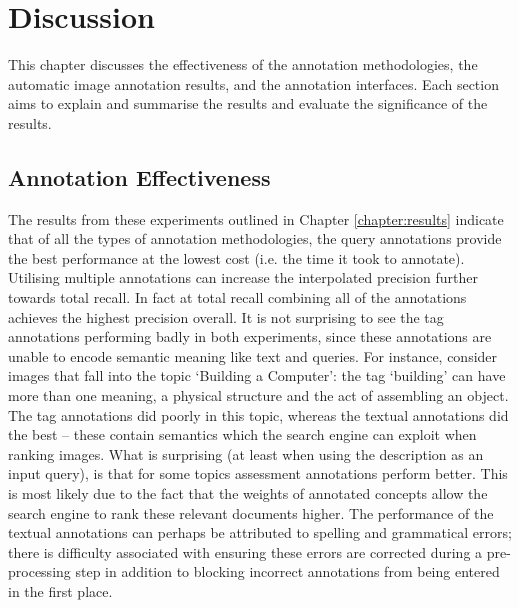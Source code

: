 \chapter{Discussion}

This chapter discusses the effectiveness of the annotation methodologies, the automatic image annotation results, and the annotation interfaces. Each section aims to explain and summarise the results and evaluate the significance of the results.

\section{Annotation Effectiveness}

The results from these experiments outlined in Chapter \ref{chapter:results} indicate that of all the types of annotation methodologies, the query annotations provide the best performance at the lowest cost (i.e. the time it took to annotate). Utilising multiple annotations can increase the interpolated precision further towards total recall. In fact at total recall combining all of the annotations achieves the highest precision overall. It is not surprising to see the tag annotations performing badly in both experiments, since these annotations are unable to encode semantic meaning like text and queries. For instance, consider images that fall into the topic `Building a Computer': the tag `building' can have more than one meaning, a physical structure and the act of assembling an object. The tag annotations did poorly in this topic, whereas the textual annotations did the best -- these contain semantics which the search engine can exploit when ranking images.  What is surprising (at least when using the description as an input query), is that for some topics assessment annotations perform better. This is most likely due to the fact that the weights of annotated concepts allow the search engine to rank these relevant documents higher. The performance of the textual annotations can perhaps be attributed to spelling and grammatical errors; there is difficulty associated with ensuring these errors are corrected during a pre-processing step in addition to blocking incorrect annotations from being entered in the first place.

